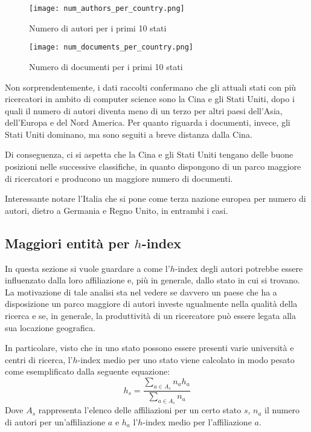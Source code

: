 \begin{figure}[tb]
  \centering
  \texttt{[image: num\_authors\_per\_country.png]}
  \caption{Numero di autori per i primi 10 stati}
  \label{fig:num-authors-per-country}
\end{figure}
\begin{figure}[tb]
  \centering
  \texttt{[image: num\_documents\_per\_country.png]}
  \caption{Numero di documenti per i primi 10 stati}
  \label{fig:num-documents-per-country}
\end{figure}

Non sorprendentemente, i dati raccolti confermano che gli attuali stati
con più ricercatori in ambito di computer science sono la Cina e gli Stati Uniti,
dopo i quali il numero di autori diventa meno di un terzo per altri paesi
dell'Asia, dell'Europa e del Nord America.
Per quanto riguarda i documenti, invece, gli Stati Uniti dominano, ma sono
seguiti a breve distanza dalla Cina.

Di conseguenza, ci si aspetta che la Cina e gli Stati Uniti tengano delle buone
posizioni nelle successive classifiche, in quanto dispongono di un parco maggiore
di ricercatori e producono un maggiore numero di documenti.

Interessante notare l'Italia che si pone come terza nazione europea per numero
di autori, dietro a Germania e Regno Unito, in entrambi i casi.

\subsection{Maggiori entità per $h$-index}

In questa sezione si vuole guardare a come l'$h$-index degli autori potrebbe
essere influenzato dalla loro affiliazione e, più in generale, dallo stato in
cui si trovano. La motivazione di tale analisi sta nel vedere se davvero
un paese che ha a disposizione un parco maggiore di autori investe ugualmente
nella qualità della ricerca e se, in generale, la produttività di un ricercatore
può essere legata alla sua locazione geografica.

In particolare, visto che in uno stato possono essere presenti varie università
e centri di ricerca, l'$h$-index medio per uno stato viene calcolato in modo
pesato come esemplificato dalla seguente equazione:
\begin{equation*}
h_s = \frac{\sum_{a\in A_s} n_a h_a}{\sum_{a\in A_s} n_a}
\end{equation*}
Dove $A_s$ rappresenta l'elenco delle affiliazioni per un certo stato $s$,
$n_a$ il numero di autori per un'affiliazione $a$ e $h_a$ l'$h$-index medio
per l'affiliazione $a$.

